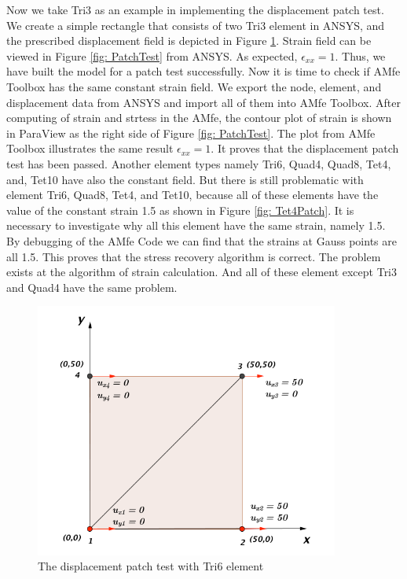 Now we take Tri3 as an example in implementing the displacement patch test. We create a simple rectangle that consists of two Tri3 element in ANSYS, and the prescribed displacement field is depicted in Figure \ref{fig: PatchMuster}. Strain field can be viewed in Figure \ref{fig: PatchTest} from ANSYS. As expected, $\epsilon_{xx} = 1$. Thus, we have built the model for a patch test successfully. Now it is time to check if AMfe Toolbox has the same constant strain field. We export the node, element, and displacement data from ANSYS and import all of them into AMfe Toolbox. After computing of strain and strtess in the AMfe, the contour plot of strain is shown in ParaView as the right side of Figure \ref{fig: PatchTest}. The plot from AMfe Toolbox illustrates the same result $\epsilon_ {xx} = 1$. It proves that the displacement patch test has been passed. Another element types namely Tri6, Quad4, Quad8, Tet4, and, Tet10 have also the constant field. But there is still problematic with element Tri6, Quad8, Tet4, and Tet10, because all of these elements have the value of the constant strain 1.5 as shown in Figure \ref{fig: Tet4Patch}. It is necessary to investigate why all this element have the same strain, namely 1.5.  By debugging of the AMfe Code we can find that the strains at Gauss points are all 1.5. This proves that the stress recovery algorithm is correct. The problem exists at the algorithm of strain calculation. And all of these element except Tri3 and Quad4 have the same problem.   

\begin{figure}
	\begin{center}
		\includegraphics[width=10cm,clip]{PatchMuster.pdf} 			
		\caption{The displacement patch test with Tri6 element} \label{fig: PatchMuster}
	\end{center}
\end{figure}

